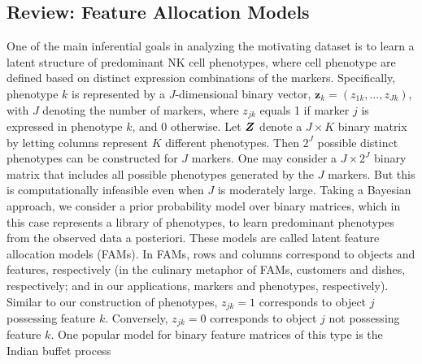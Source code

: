 \documentclass[12pt,]{article}
\newcommand{\bZ}{\mbox{\boldmath $Z$}}
\begin{document}
% 


\subsection{Review: Feature Allocation Models}\label{literature-review}
One of the main inferential goals in analyzing the motivating dataset is to
learn a latent structure of predominant NK cell phenotypes, where cell
phenotype are defined based on distinct expression combinations of the markers.
Specifically, phenotype $k$ is represented by a $J$-dimensional binary vector,
$\bm z_k=(z_{1k}, \ldots, z_{Jk})$, with $J$ denoting the number of markers,
where $z_{jk}$ equals 1 if marker $j$ is expressed in phenotype $k$, and 0
otherwise.  Let $\bZ$ denote a $J \times K$ binary matrix by letting columns
represent $K$ different phenotypes.  Then \(2^J\) possible distinct phenotypes
can be constructed for \(J\) markers.  One may consider a \(J \times 2^J\)
binary matrix that includes all possible phenotypes generated by the \(J\)
markers. But this is computationally infeasible even when \(J\) is moderately
large.  Taking a Bayesian approach, we consider a prior probability model over
binary matrices, which in this case represents a library of  phenotypes, to
learn predominant phenotypes from the observed data a posteriori.  These models
are called latent feature allocation models (FAMs). In FAMs, rows and columns
correspond to objects and features, respectively (in the culinary metaphor of
FAMs, customers and dishes, respectively; and in our applications, markers and
phenotypes, respectively). Similar to our construction of phenotypes,
$z_{jk}=1$ corresponds to object $j$ possessing feature $k$.  Conversely,
$z_{jk}=0$ corresponds to object $j$ not possessing feature $k$.  One popular
model for binary feature matrices of this type is the Indian buffet process
\end{document}
